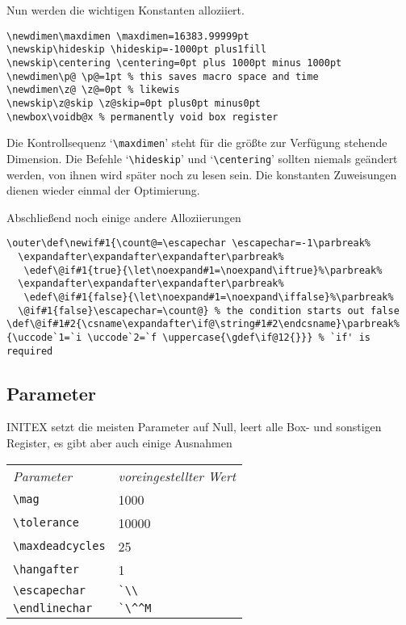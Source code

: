 \begin{appendix}
Nun werden die wichtigen Konstanten 
alloziiert.
\begin{verbatim}
\newdimen\maxdimen \maxdimen=16383.99999pt
\newskip\hideskip \hideskip=-1000pt plus1fill
\newskip\centering \centering=0pt plus 1000pt minus 1000pt
\newdimen\p@ \p@=1pt % this saves macro space and time
\newdimen\z@ \z@=0pt % likewis
\newskip\z@skip \z@skip=0pt plus0pt minus0pt
\newbox\voidb@x % permanently void box register
\end{verbatim}
Die Kontrollsequenz `\verb|\maxdimen|' steht f\"ur die gr\"o\ss{}te zur
Verf\"ugung stehende Dimension. Die Befehle `\verb|\hideskip|' und
`\verb|\centering|' sollten niemals ge\"andert werden, von ihnen wird
sp\"ater noch zu lesen sein. Die konstanten Zuweisungen dienen wieder
einmal der Optimierung.

Abschlie\ss{}end noch einige andere Alloziierungen
\begin{verbatim}
\outer\def\newif#1{\count@=\escapechar \escapechar=-1\parbreak%
  \expandafter\expandafter\expandafter\parbreak%
   \edef\@if#1{true}{\let\noexpand#1=\noexpand\iftrue}%\parbreak%
  \expandafter\expandafter\expandafter\parbreak%
   \edef\@if#1{false}{\let\noexpand#1=\noexpand\iffalse}%\parbreak%
  \@if#1{false}\escapechar=\count@} % the condition starts out false
\def\@if#1#2{\csname\expandafter\if@\string#1#2\endcsname}\parbreak%
{\uccode`1=`i \uccode`2=`f \uppercase{\gdef\if@12{}}} % `if' is required
\end{verbatim}
\subsection{Parameter}
INITEX setzt die meisten Parameter auf Null, leert alle Box- und
sonstigen Register, es gibt aber auch einige Ausnahmen

\medskip\begin{tabular}{ll}
{\em Parameter} & {\em voreingestellter Wert}\\[.5ex]
\verb|\mag| & 1000\\
\verb|\tolerance| & 10000\\
\verb|\maxdeadcycles| & 25\\
\verb|\hangafter| & 1\\
\verb|\escapechar| & \verb|`\\|\\
\verb|\endlinechar| & \verb|`\^^M|
\end{tabular}\medskip


\end{appendix}
